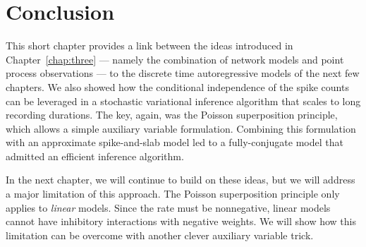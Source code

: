 \begin{table}
  \centering
  \caption[Comparison of inference algorithms on the Chalearn connectomics challenge]{Comparison of inference algorithms on link prediction for five networks from the Chalearn connectomics challenge. Performance is measured by area under the ROC curve and area under the precision recall curve (PRC). In four of the five networks a Hawkes process model provides the best results.}
  \label{tab:chalearn}
\end{table}

\section{Conclusion}

This short chapter provides a link between the ideas introduced
in Chapter~\ref{chap:three} --- namely the combination of network
models and point process observations --- to the discrete time
autoregressive models of the next few chapters. We also showed
how the conditional independence of the spike counts can be leveraged
in a stochastic variational inference algorithm that scales to
long recording durations. The key, again, was the Poisson superposition
principle, which allows a simple auxiliary variable formulation.
Combining this formulation with an approximate spike-and-slab
model led to a fully-conjugate model that admitted an efficient
inference algorithm.

In the next chapter, we will continue to build on these ideas, but we
will address a major limitation of this approach. The Poisson
superposition principle only applies to \emph{linear} models. Since
the rate must be nonnegative, linear models cannot have inhibitory
interactions with negative weights. We will show how this limitation
can be overcome with another clever auxiliary variable trick.

